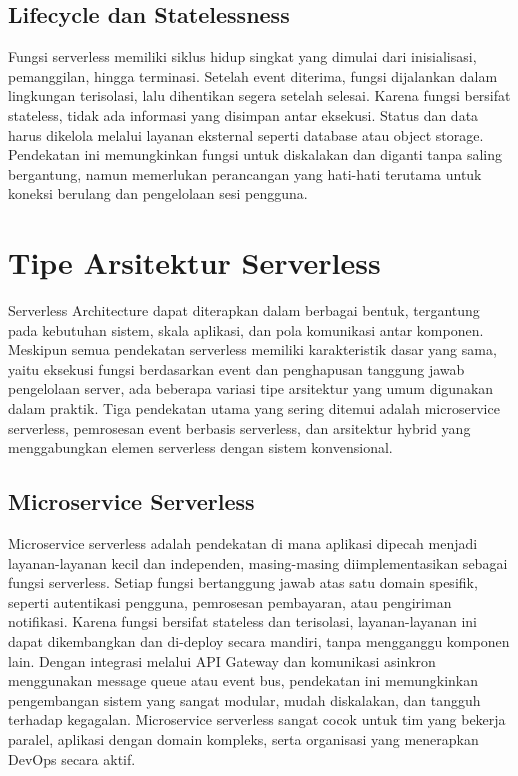 \subsection{Lifecycle dan Statelessness}

Fungsi serverless memiliki siklus hidup singkat yang dimulai dari inisialisasi, pemanggilan, hingga terminasi. Setelah event diterima, fungsi dijalankan dalam lingkungan terisolasi, lalu dihentikan segera setelah selesai. Karena fungsi bersifat stateless, tidak ada informasi yang disimpan antar eksekusi. Status dan data harus dikelola melalui layanan eksternal seperti database atau object storage. Pendekatan ini memungkinkan fungsi untuk diskalakan dan diganti tanpa saling bergantung, namun memerlukan perancangan yang hati-hati terutama untuk koneksi berulang dan pengelolaan sesi pengguna.



\section{Tipe Arsitektur Serverless}

Serverless Architecture dapat diterapkan dalam berbagai bentuk, tergantung pada kebutuhan sistem, skala aplikasi, dan pola komunikasi antar komponen. Meskipun semua pendekatan serverless memiliki karakteristik dasar yang sama, yaitu eksekusi fungsi berdasarkan event dan penghapusan tanggung jawab pengelolaan server, ada beberapa variasi tipe arsitektur yang umum digunakan dalam praktik. Tiga pendekatan utama yang sering ditemui adalah microservice serverless, pemrosesan event berbasis serverless, dan arsitektur hybrid yang menggabungkan elemen serverless dengan sistem konvensional.

\subsection{Microservice Serverless}

Microservice serverless adalah pendekatan di mana aplikasi dipecah menjadi layanan-layanan kecil dan independen, masing-masing diimplementasikan sebagai fungsi serverless. Setiap fungsi bertanggung jawab atas satu domain spesifik, seperti autentikasi pengguna, pemrosesan pembayaran, atau pengiriman notifikasi. Karena fungsi bersifat stateless dan terisolasi, layanan-layanan ini dapat dikembangkan dan di-deploy secara mandiri, tanpa mengganggu komponen lain. Dengan integrasi melalui API Gateway dan komunikasi asinkron menggunakan message queue atau event bus, pendekatan ini memungkinkan pengembangan sistem yang sangat modular, mudah diskalakan, dan tangguh terhadap kegagalan. Microservice serverless sangat cocok untuk tim yang bekerja paralel, aplikasi dengan domain kompleks, serta organisasi yang menerapkan DevOps secara aktif.


